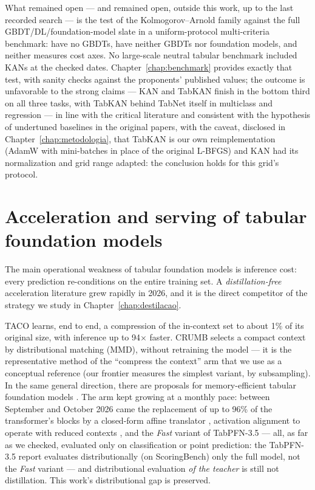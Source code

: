 What remained open --- and remained open, outside this work, up to
the last recorded search --- is the test of the Kolmogorov--Arnold
family against the full GBDT/DL/foundation-model slate in a
uniform-protocol multi-criteria benchmark: \citet{poeta2024} have
no GBDTs, \citet{kancritical2024} have neither GBDTs nor foundation
models, and neither measures cost axes. No large-scale neutral
tabular benchmark included KANs at the checked dates.
Chapter~\ref{chap:benchmark} provides exactly that test, with
sanity checks against the proponents' published values; the outcome
is unfavorable to the strong claims --- KAN and TabKAN finish in
the bottom third on all three tasks, with TabKAN behind TabNet
itself in multiclass and regression --- in line with the critical
literature and consistent with the hypothesis of undertuned
baselines in the original papers, with the caveat, disclosed in
Chapter~\ref{chap:metodologia}, that TabKAN is our own
reimplementation (AdamW with mini-batches in place of the original
L-BFGS) and KAN had its normalization and grid range adapted: the
conclusion holds for this grid's protocol.

\section{Acceleration and serving of tabular foundation models}
\label{sec:rel-serving}

The main operational weakness of tabular foundation models is
inference cost: every prediction re-conditions on the entire
training set. A \emph{distillation-free} acceleration literature
grew rapidly in 2026, and it is the direct competitor of the
strategy we study in Chapter~\ref{chap:destilacao}.

TACO \citep{taco2026} learns, end to end, a compression of the
in-context set to about 1\% of its original size, with inference up
to 94$\times$ faster. CRUMB \citep{crumb2026} selects a compact
context by distributional matching (MMD), without retraining the
model --- it is the representative method of the ``compress the
context'' arm that we use as a conceptual reference (our frontier
measures the simplest variant, by subsampling). In the same general
direction, there are proposals for memory-efficient tabular
foundation models \citep{memeff2026}. The arm kept growing at a
monthly pace: between September and October 2026 came the
replacement of up to 96\% of the transformer's blocks by a
closed-form affine translator \citep{shallow2026}, activation
alignment to operate with reduced contexts \citep{actalign2026},
and the \emph{Fast} variant of TabPFN-3.5
\citep{tabpfn35tr2026} --- all, as far as we
checked, evaluated only on classification or point prediction: the
TabPFN-3.5 report evaluates distributionally (on ScoringBench) only
the full model, not the \emph{Fast} variant --- and distributional
evaluation \emph{of the teacher} is still not distillation. This
work's distributional gap is preserved.

